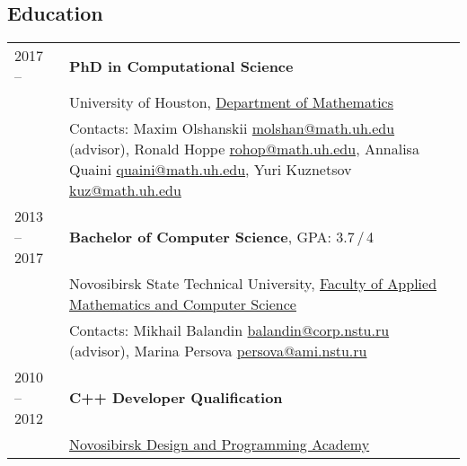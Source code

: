 \documentclass[a4paper,12pt]{article}
\begin{document}
	\subsection*{Education}

	\begin{longtable}{ l >{\raggedright\arraybackslash}p{15cm} }
		2017 --
			& \textbf{PhD in Computational Science} \vspace{1mm}\\
		\phantom{Summer 2018} 
			& University of Houston, \href{http://www.uh.edu/nsm/math/}{Department of Mathematics} \vspace{1mm}\\
			& Contacts: Maxim Olshanskii \href{mailto:molshan@math.uh.edu}{molshan@math.uh.edu} (advisor), Ronald Hoppe \href{m
				ailto:rohop@math.uh.edu}{rohop@math.uh.edu}, 
			Annalisa Quaini \href{mailto:quaini@math.uh.edu}{quaini@math.uh.edu}, Yuri Kuznetsov \href{mailto:kuz@math.uh.edu}{kuz@math.uh.edu} \vspace{3mm}\\
		2013 -- 2017
			& \textbf{Bachelor of Computer Science}, GPA: 3.7\,/\,4 \vspace{1mm}\\
			& Novosibirsk State Technical University, \href{http://en.nstu.ru/faculties/faculty_of_applied_mathematics_and_computer_science/}{Faculty of Applied Mathematics and Computer Science} \vspace{1mm}\\
			& Contacts: Mikhail Balandin \href{mailto:balandin@corp.nstu.ru}{balandin@corp.nstu.ru} (advisor), Marina Persova \href{mailto:persova@ami.nstu.ru}{persova@ami.nstu.ru} \vspace{3mm}\\
		2010 -- 2012
			& \textbf{C++ Developer Qualification} \vspace{1mm}\\
			& \href{http://www.nadip.ru/}{Novosibirsk Design and Programming Academy}\\
	\end{longtable}
\end{document}
